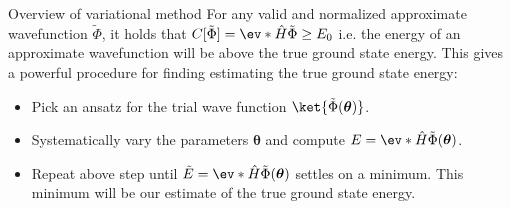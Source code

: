 \begin{frame}{Overview of variational method}
  For any valid and normalized approximate wavefunction $\tilde{\Phi}$, it holds that {\color{red} $C[\tilde{\Phi}] =  {\ev*{\hat{H}}{\tilde{\Phi}}} \geq E_{0}$}
  i.e. the energy of an approximate wavefunction will be above the true ground state energy. This gives a powerful procedure for finding
  estimating the true ground state energy:

  \begin{itemize}
    \setlength\itemsep{0.1em}
    \item Pick an {\color{red}ansatz} for the trial wave function $\ket{\tilde{\Phi}(\boldsymbol{\theta})}$.
    \item Systematically vary the parameters $\boldsymbol{\theta}$ and compute $E = \ev*{\hat{H}}{\tilde{\Phi}(\boldsymbol{\theta})}$.
    \item Repeat above step until $\tilde{E} = \ev*{\hat{H}}{\tilde{\Phi}(\boldsymbol{\theta})}$ settles on a minimum.
          This minimum will be our estimate of the true ground state energy.
  \end{itemize}
\end{frame}


